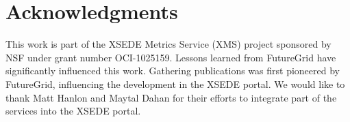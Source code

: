 \documentclass[sigconf]{acmart}
\begin{document}

\section{Acknowledgments}

This work is part of the XSEDE Metrics Service (XMS) project sponsored
by NSF under grant number OCI-1025159. Lessons learned from FutureGrid
have significantly influenced this work. Gathering publications was
first pioneered by FutureGrid, influencing the development in the XSEDE
portal. We would like to thank Matt Hanlon and Maytal Dahan for their
efforts to integrate part of the services into the XSEDE portal.




\end{document}
